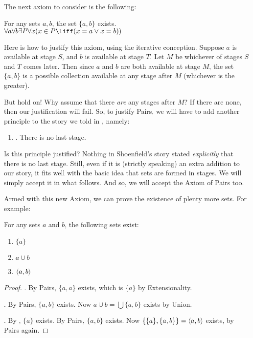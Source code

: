 \documentclass[../../../include/open-logic-section]{subfiles}
\begin{document}

The next axiom to consider is the following:

\begin{axiom}[Pairs]
For any sets $a, b$, the set $\{a, b\}$ exists.\\
	$\forall a \forall b \exists P \forall x (x \in P \liff (x = a \lor x = b))$
\end{axiom}

Here is how to justify this axiom, using the iterative conception. Suppose $a$ is available at stage $S$, and $b$ is available at stage $T$. Let $M$ be whichever of stages $S$ and $T$ comes later. Then since $a$ and $b$ are both available at stage $M$, the set $\{a,b\}$ is a possible collection available at any stage after $M$ (whichever is the greater). 

But hold on!{} Why assume that there \emph{are} any stages after $M$? If there are none, then our justification will fail. So, to justify Pairs, we will have to add another principle to the story we told in , namely:
\begin{enumerate}
	\item[] \stagessucc. There is no last stage.
\end{enumerate}
Is this principle justified? Nothing in Shoenfield's story stated
\emph{explicitly} that there is no last stage. Still, even if it is
(strictly speaking) an extra addition to our story, it fits well with
the basic idea that sets are formed in stages. We will simply accept
it in what follows. And so, we will accept the Axiom of Pairs too.

Armed with this new Axiom, we can prove the existence of plenty more sets. For example:

\begin{prop}
For any sets $a$ and $b$, the following sets exist:
	\begin{enumerate}
		\item{} $\{a\}$
		\item{} $a \cup b$
		\item{} $\langle a, b \rangle$
	\end{enumerate}
\end{prop}

\begin{proof}
. By Pairs, $\{a, a\}$ exists, which is $\{a\}$ by
Extensionality. 

. By Pairs, $\{a, b\}$ exists. Now $a \cup b = \bigcup
\{a, b\}$ exists by Union. 

. By , $\{a\}$ exists. By Pairs, $\{a,
b\}$ exists. Now $\{\{a\}, \{a, b\}\} = \langle a, b \rangle$ exists, by Pairs
again.
\end{proof}
\end{document}

